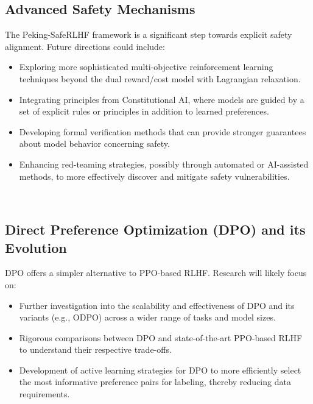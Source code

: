 \documentclass{article} %
\begin{document}
\subsection{Advanced Safety Mechanisms}
The Peking-SafeRLHF framework  is a significant step towards explicit safety alignment. Future directions could include:
\begin{itemize}
\item Exploring more sophisticated multi-objective reinforcement learning techniques beyond the dual reward/cost model with Lagrangian relaxation.
\item Integrating principles from Constitutional AI, where models are guided by a set of explicit rules or principles in addition to learned preferences.
\item Developing formal verification methods that can provide stronger guarantees about model behavior concerning safety.
\item Enhancing red-teaming strategies, possibly through automated or AI-assisted methods, to more effectively discover and mitigate safety vulnerabilities.
\end{itemize}  

\subsection{Direct Preference Optimization (DPO) and its Evolution}
DPO offers a simpler alternative to PPO-based RLHF. Research will likely focus on:
\begin{itemize}
\item Further investigation into the scalability and effectiveness of DPO and its variants (e.g., ODPO) across a wider range of tasks and model sizes.
\item Rigorous comparisons between DPO and state-of-the-art PPO-based RLHF to understand their respective trade-offs.
\item Development of active learning strategies for DPO to more efficiently select the most informative preference pairs for labeling, thereby reducing data requirements.
\end{itemize}  
\end{document}
